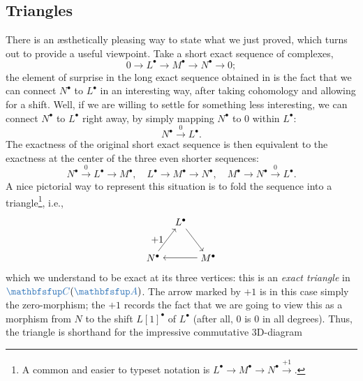 \subsection{Triangles}
\label{subsec:homol:triangles}

There is an æsthetically pleasing way to state what we just proved,
which turns out to provide a useful viewpoint. Take a short exact
sequence of complexes,
\[
  0 \longrightarrow L^\bullet \longrightarrow M^\bullet
  \longrightarrow N^\bullet \longrightarrow 0;
\]
the element of surprise in the long exact sequence obtained in
 is the fact
that we can connect $N^\bullet$ to $L^\bullet$ in an interesting way,
after taking cohomology and allowing for a shift.  Well, if we are
willing to settle for something less interesting, we can connect
$N^\bullet$ to $L^\bullet$ right away, by simply mapping $N^\bullet$
to $0$ within $L^\bullet$:
\[
  N^\bullet \xrightarrow{0} L^\bullet.
\]
The exactness of the original short exact sequence is then equivalent
to the exactness at the center of the three even shorter sequences:
\[
  N^\bullet \xrightarrow{0} L^\bullet \longrightarrow M^\bullet, \quad
  L^\bullet \longrightarrow M^\bullet \longrightarrow N^\bullet, \quad
  M^\bullet \longrightarrow N^\bullet \xrightarrow{0} L^\bullet.
\]
A nice pictorial way to represent this situation is to fold the
sequence into a triangle\footnote{A common and easier to typeset
  notation is
  $L^\bullet \longrightarrow M^\bullet \longrightarrow N^\bullet
  \xrightarrow{+1}$.}, i.e.,
\[
  \begin{tikzpicture}[baseline=(current bounding box.center)]
    \node (L) at (1,1.3)
    {$L^\bullet$}; \node (N) at (0,0)
    {$N^\bullet$}; \node (M) at (2,0)
    {$M^\bullet$}; \draw[->] (L) -- (M); \draw[->] (M) -- (N);
    \draw[->] (N) -- (L) node[midway, left] {$+1$};
  \end{tikzpicture}
\]
which we understand to be exact at its three vertices: this is an
\emph{exact triangle} in $\categ{C}(\categ{A})$. The arrow marked by
$+1$ is in this case simply the zero-morphism; the $+1$ records the
fact that we are going to view this as a morphism from $N$ to the
shift $L[1]^\bullet$ of $L^\bullet$ (after all, $0$ is $0$ in all
degrees). Thus, the triangle is shorthand for the impressive
commutative 3D-diagram
